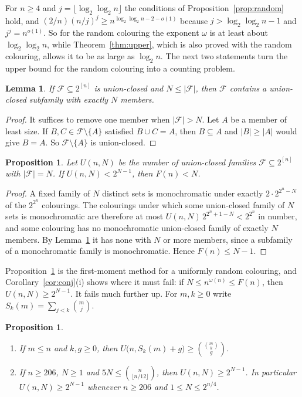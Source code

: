 \documentclass[11pt,reqno]{amsart}
\numberwithin{equation}{section}
\theoremstyle{plain}
\newtheorem{lemma}[theorem]{Lemma}
\newtheorem{proposition}[theorem]{Proposition}
\theoremstyle{definition}
\theoremstyle{remark}
\newcommand{\cF}{\mathcal{F}}
\begin{document}
For $n\ge4$ and $j=\lfloor\log_2\log_2n\rfloor$ the conditions of
Proposition~\ref{prop:random} hold, and $(2/n)(n/j)^{j}\ge
n^{\log_2\log_2n-2-o(1)}$ because $j>\log_2\log_2n-1$ and
$j^{j}=n^{o(1)}$. So for the random
colouring the exponent $\omega$ is at least about $\log_2\log_2n$, while
Theorem~\ref{thm:upper}, which is also proved with the random colouring,
allows it to be as large as $\log_2n$. The next two statements turn the
upper bound for the random colouring into a counting problem.

\begin{lemma}
\label{lem:subfamily}
If $\cF\subseteq2^{[n]}$ is union-closed and $N\le|\cF|$, then $\cF$
contains a union-closed subfamily with exactly $N$ members.
\end{lemma}

\begin{proof}
It suffices to remove one member when $|\cF|>N$. Let $A$ be a member of
least size. If $B,C\in\cF\setminus\{A\}$ satisfied $B\cup C=A$, then
$B\subseteq A$ and $|B|\ge|A|$ would give $B=A$. So $\cF\setminus\{A\}$
is union-closed.
\end{proof}

\begin{proposition}
\label{prop:count}
Let $U(n,N)$ be the number of union-closed families $\cF\subseteq
2^{[n]}$ with $|\cF|=N$. If $U(n,N)<2^{N-1}$, then $F(n)<N$.
\end{proposition}

\begin{proof}
A fixed family of $N$ distinct sets is monochromatic under exactly
$2\cdot2^{2^{n}-N}$ of the $2^{2^{n}}$ colourings. The colourings under
which some union-closed family of $N$ sets is monochromatic are therefore
at most $U(n,N)\,2^{2^{n}+1-N}<2^{2^{n}}$ in number, and some colouring
has no monochromatic union-closed family of exactly $N$ members. By
Lemma~\ref{lem:subfamily} it has none with $N$ or more members, since a
subfamily of a monochromatic family is monochromatic. Hence
$F(n)\le N-1$.
\end{proof}

Proposition~\ref{prop:count} is the first-moment method for a uniformly
random colouring, and Corollary~\ref{cor:conj}(i) shows where it must
fail: if $N\le n^{\omega(n)}\le F(n)$, then $U(n,N)\ge2^{N-1}$. It fails
much further up. For $m,k\ge0$ write $S_k(m)=\sum_{j<k}\binom mj$.

\begin{proposition}
\label{prop:countfails}
\leavevmode
\begin{enumerate}[label=\textup{(\roman*)},leftmargin=2em]
\item If $m\le n$ and $k,g\ge0$, then
$U\bigl(n,S_k(m)+g\bigr)\ge\binom{\binom mk}{g}$.
\item If $n\ge206$, $N\ge1$ and $5N\le\binom{n}{\lfloor n/12\rfloor}$, then
$U(n,N)\ge2^{N-1}$. In particular $U(n,N)\ge2^{N-1}$ whenever
$n\ge206$ and $1\le N\le2^{n/4}$.
\end{enumerate}
\end{proposition}
\end{document}
